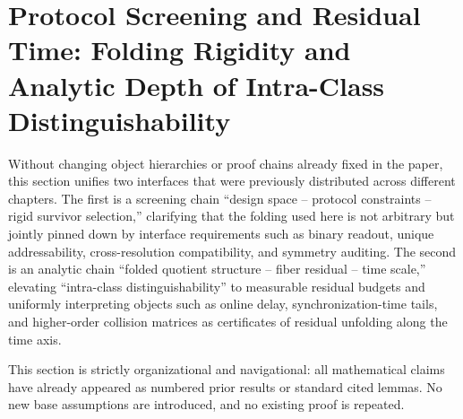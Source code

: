 \section{Protocol Screening and Residual Time: Folding Rigidity and Analytic Depth of Intra-Class Distinguishability}\label{sec:fold-residual-time}

Without changing object hierarchies or proof chains already fixed in the paper, this section unifies two interfaces that were previously distributed across different chapters. The first is a screening chain ``design space -- protocol constraints -- rigid survivor selection,'' clarifying that the folding used here is not arbitrary but jointly pinned down by interface requirements such as binary readout, unique addressability, cross-resolution compatibility, and symmetry auditing. The second is an analytic chain ``folded quotient structure -- fiber residual -- time scale,'' elevating ``intra-class distinguishability'' to measurable residual budgets and uniformly interpreting objects such as online delay, synchronization-time tails, and higher-order collision matrices as certificates of residual unfolding along the time axis.\par
This section is strictly organizational and navigational: all mathematical claims have already appeared as numbered prior results or standard cited lemmas. No new base assumptions are introduced, and no existing proof is repeated.






